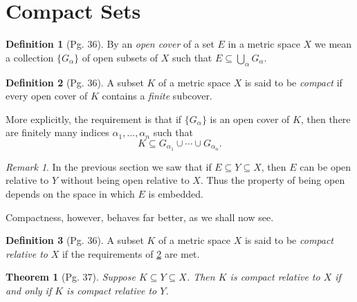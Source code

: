 \documentclass[leqno]{article}
\newtheorem{theorem}{Theorem}[section]
\theoremstyle{definition}
\newtheorem{definition}{Definition}[section]
\theoremstyle{remark}
\newtheorem*{remark}{Remark}
\begin{document}
        \section{Compact Sets}
            \begin{definition}[Pg. 36]\label{def:6.1}
                By an \emph{open cover} of a set $E$ in a metric space $X$ we mean a collection $\{G_{\alpha}\}$ of open subsets of $X$ such that $E\subseteq\bigcup_{\alpha} G_{\alpha}$. \cite{rud}
            \end{definition}
            \begin{definition}[Pg. 36]\label{def:6.2}
                A subset $K$ of a metric space $X$ is said to be \emph{compact} if every open cover of $K$ contains a \emph{finite} subcover.\par More explicitly, the requirement is that if $\{G_{\alpha}\}$ is an open cover of $K$, then there are finitely many indices $\alpha_1,\dots,\alpha_n$ such that 
                    \begin{equation*}
                        K\subseteq G_{\alpha_1}\cup\cdots\cup G_{\alpha_n}.
                    \end{equation*}
                \cite{rud}
            \end{definition}
            \begin{remark}
                In the previous section we saw that if $E\subseteq Y\subseteq X$, then $E$ can be open relative to $Y$ without being open relative to $X$. Thus the property of being open depends on the space in which $E$ is embedded.\par\hspace{4mm} Compactness, however, behaves far better, as we shall now see.
            \end{remark}
            \begin{definition}[Pg. 36]\label{def:6.3}
                A subset $K$ of a metric space $X$ is said to be \emph{compact relative to} $X$ if the requirements of \cref{def:6.2} are met. \cite{rud}
            \end{definition}
            \begin{theorem}[Pg. 37]\label{thm:6.1}
                Suppose $K\subseteq Y\subseteq X$. Then $K$ is compact relative to $X$ if and only if $K$ is compact relative to $Y$. 
            \end{theorem}
\end{document}

